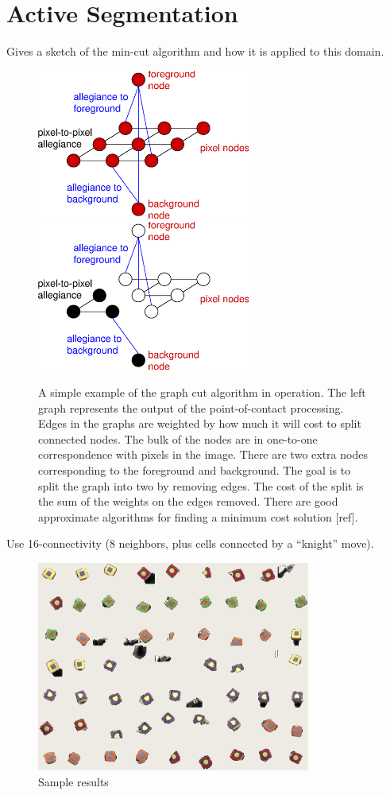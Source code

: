
\ifverbose

\section{Active Segmentation}

Gives a sketch of the min-cut algorithm and how it is applied to
this domain.

\begin{figure}[tbh]
\begin{center}
\includegraphics[width=7cm]{cut-graph1.eps}
\hspace{1cm}
\includegraphics[width=7cm]{cut-graph2.eps}
\caption{ 
\label{fig:cut-graph}
%
A simple example of the graph cut algorithm in operation.  
The left graph represents the output of the point-of-contact 
processing.  Edges in the graphs are weighted by how much
it will cost to split connected nodes.  The bulk of the nodes
are in one-to-one correspondence with pixels in the image.
There are two extra nodes corresponding to the foreground and
background.  The goal is to split the graph into two by removing
edges.  The cost of the split is the sum of the weights on the 
edges removed.  There are good approximate algorithms for
finding a minimum cost solution [ref].
%
}
\end{center}
\end{figure}

Use 16-connectivity (8 neighbors, plus cells connected by a
``knight'' move).

\fi


\begin{figure}[tbh]
  \centerline{\includegraphics[width=9cm]{experiment-montage}}
  \caption{Sample results}
  \label{fig:sample-results}
\end{figure}

